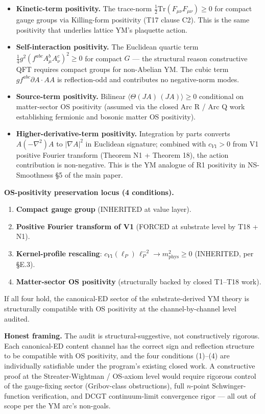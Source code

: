 \documentclass[
]{article}
\providecommand{\tightlist}{%
  \setlength{\itemsep}{0pt}\setlength{\parskip}{0pt}}
\begin{document}
\begin{itemize}
\tightlist
\item
  \textbf{Kinetic-term positivity.} The trace-norm
  \(\tfrac{1}{2}\mathrm{Tr}(F_{\mu\nu}F_{\mu\nu}) \ge 0\) for compact
  gauge groups via Killing-form positivity (T17 clause C2). This is the
  same positivity that underlies lattice YM's plaquette action.
\item
  \textbf{Self-interaction positivity.} The Euclidean quartic term
  \(\tfrac{1}{4}g^2(f^{abc}A_\mu^b A_\nu^c)^2 \ge 0\) for compact \(G\)
  --- the structural reason constructive QFT requires compact groups for
  non-Abelian YM. The cubic term \(gf^{abc}\partial A\cdot AA\) is
  reflection-odd and contributes no negative-norm modes.
\item
  \textbf{Source-term positivity.} Bilinear
  \(\langle\Theta(JA)\,(JA)\rangle \ge 0\) conditional on matter-sector
  OS positivity (assumed via the closed Arc R / Arc Q work establishing
  fermionic and bosonic matter OS positivity).
\item
  \textbf{Higher-derivative-term positivity.} Integration by parts
  converts \(A(-\nabla^2)A\) to \(|\nabla A|^2\) in Euclidean signature;
  combined with \(c_{V1} > 0\) from V1 positive Fourier transform
  (Theorem N1 + Theorem 18), the action contribution is non-negative.
  This is the YM analogue of R1 positivity in NS-Smoothness §5 of the
  main paper.
\end{itemize}

\textbf{OS-positivity preservation locus (4 conditions).}

\begin{enumerate}
\def\labelenumi{\arabic{enumi}.}
\tightlist
\item
  \textbf{Compact gauge group} (INHERITED at value layer).
\item
  \textbf{Positive Fourier transform of V1} (FORCED at substrate level
  by T18 + N1).
\item
  \textbf{Kernel-profile rescaling}:
  \(c_{V1}(\ell_P)\,\ell_P^{-2} \to m_\mathrm{phys}^2 \ge 0\)
  (INHERITED, per §E.3).
\item
  \textbf{Matter-sector OS positivity} (structurally backed by closed
  T1--T18 work).
\end{enumerate}

If all four hold, the canonical-ED sector of the substrate-derived YM
theory is structurally compatible with OS positivity at the
channel-by-channel level audited.

\textbf{Honest framing.} The audit is structural-suggestive, not
constructively rigorous. Each canonical-ED content channel has the
correct sign and reflection structure to be compatible with OS
positivity, and the four conditions (1)--(4) are individually
satisfiable under the program's existing closed work. A constructive
proof at the Streater-Wightman / OS-axiom level would require rigorous
control of the gauge-fixing sector (Gribov-class obstructions), full
\(n\)-point Schwinger-function verification, and DCGT continuum-limit
convergence rigor --- all out of scope per the YM arc's non-goals.
\end{document}
